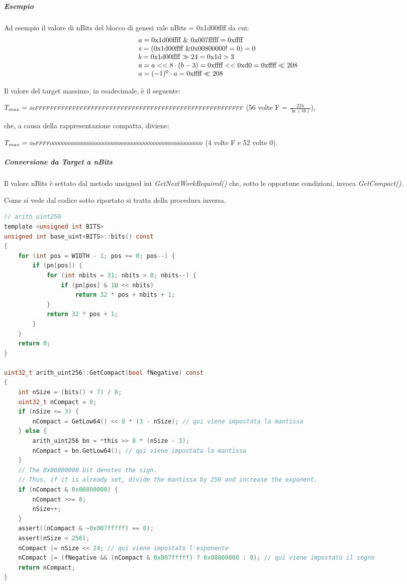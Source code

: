 \documentclass{book}
\theoremstyle{definition}
\begin{document}
\subparagraph{Esempio}
Ad esempio il valore di nBits del blocco di genesi vale nBits = 0x1d00ffff da cui:
\begin{equation}
    \begin{array}{ll}
        a = \textnormal{0x1d00ffff} \ \& \ \textnormal{0x007fffff} = \textnormal{0xffff} \\
        s = (\textnormal{0x1d00ffff} \ \& \textnormal{0x00800000} != 0) = 0 \\
        b = \textnormal{0x1d00ffff} \gg 24 = \textnormal{0x1d} > 3\\
        a = a << 8 \cdot (b - 3) = \textnormal{0xffff} << \textnormal{0xd0} = \textnormal{0xffff} \ll 208 \\
        a = (-1)^0 \cdot a =  \textnormal{0xffff} \ll 208
    \end{array}
\end{equation}

Il valore del target massimo, in esadecimale, è il seguente:

$T_{max} = \textit{\scriptsize{0xFFFFFFFFFFFFFFFFFFFFFFFFFFFFFFFFFFFFFFFFFFFFFFFFFFFFFFFF}}$  (56 volte F = $\frac{224}{\ln(16)}$),

che, a causa della rappresentazione compatta, diviene:

$T_{max} = \textit{\scriptsize{0xFFFF0000000000000000000000000000000000000000000000000000}}$ (4 volte F e 52 volte 0).

\subparagraph{Conversione da Target a nBits}

Il valore nBits è settato dal metodo unsigned int \textit{GetNextWorkRequired()} che,
sotto le opportune condizioni, invoca \textit{GetCompact()}.

Come si vede dal codice sotto riportato si tratta della procedura inversa.

\lstset{style=mystyle}
\begin{lstlisting}[language=c]
// arith_uint256
template <unsigned int BITS>
unsigned int base_uint<BITS>::bits() const
{
    for (int pos = WIDTH - 1; pos >= 0; pos--) {
        if (pn[pos]) {
            for (int nbits = 31; nbits > 0; nbits--) {
                if (pn[pos] & 1U << nbits)
                    return 32 * pos + nbits + 1;
            }
            return 32 * pos + 1;
        }
    }
    return 0;
}

uint32_t arith_uint256::GetCompact(bool fNegative) const
{
    int nSize = (bits() + 7) / 8;
    uint32_t nCompact = 0;
    if (nSize <= 3) {
        nCompact = GetLow64() << 8 * (3 - nSize); // qui viene impostata la mantissa
    } else {
        arith_uint256 bn = *this >> 8 * (nSize - 3);
        nCompact = bn.GetLow64(); // qui viene impostata la mantissa
    }
    // The 0x00800000 bit denotes the sign.
    // Thus, if it is already set, divide the mantissa by 256 and increase the exponent.
    if (nCompact & 0x00800000) {
        nCompact >>= 8;
        nSize++;
    }
    assert((nCompact & ~0x007fffff) == 0);
    assert(nSize < 256);
    nCompact |= nSize << 24; // qui viene impostato l'esponente
    nCompact |= (fNegative && (nCompact & 0x007fffff) ? 0x00800000 : 0); // qui viene impostato il segno
    return nCompact;
}
\end{lstlisting}
\end{document}
